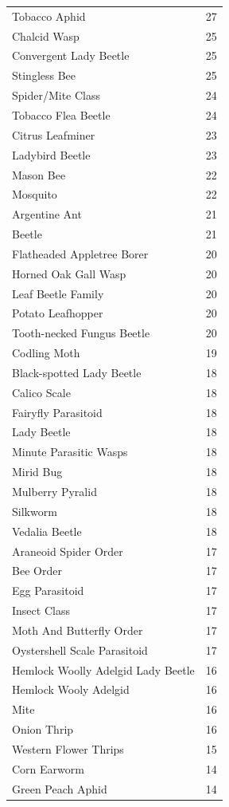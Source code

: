 \documentclass[
  12pt,
]{article}
\begin{document}
\begin{longtable}[]{@{}lr@{}}
Tobacco Aphid & 27 \\
Chalcid Wasp & 25 \\
Convergent Lady Beetle & 25 \\
Stingless Bee & 25 \\
Spider/Mite Class & 24 \\
Tobacco Flea Beetle & 24 \\
Citrus Leafminer & 23 \\
Ladybird Beetle & 23 \\
Mason Bee & 22 \\
Mosquito & 22 \\
Argentine Ant & 21 \\
Beetle & 21 \\
Flatheaded Appletree Borer & 20 \\
Horned Oak Gall Wasp & 20 \\
Leaf Beetle Family & 20 \\
Potato Leafhopper & 20 \\
Tooth-necked Fungus Beetle & 20 \\
Codling Moth & 19 \\
Black-spotted Lady Beetle & 18 \\
Calico Scale & 18 \\
Fairyfly Parasitoid & 18 \\
Lady Beetle & 18 \\
Minute Parasitic Wasps & 18 \\
Mirid Bug & 18 \\
Mulberry Pyralid & 18 \\
Silkworm & 18 \\
Vedalia Beetle & 18 \\
Araneoid Spider Order & 17 \\
Bee Order & 17 \\
Egg Parasitoid & 17 \\
Insect Class & 17 \\
Moth And Butterfly Order & 17 \\
Oystershell Scale Parasitoid & 17 \\
Hemlock Woolly Adelgid Lady Beetle & 16 \\
Hemlock Wooly Adelgid & 16 \\
Mite & 16 \\
Onion Thrip & 16 \\
Western Flower Thrips & 15 \\
Corn Earworm & 14 \\
Green Peach Aphid & 14 \\

\end{longtable}
\end{document}
